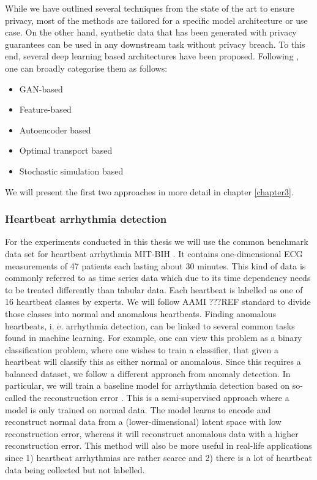 While we have outlined several techniques from the state of the art to ensure privacy, most of the methods are tailored for a specific model architecture or use case. On the other hand, synthetic data that has been generated with privacy guarantees can be used in any downstream task without privacy breach. To this end, several deep learning based architectures have been proposed. Following \parencite{hu2023sok}, one can broadly categorise them as follows:
\begin{itemize}
    \item GAN-based
    \item Feature-based
    \item Autoencoder based {\tiny \Parencite[see e. g.][for a generator based on a variational autoencoder that is trained with DP-SGD]{vae}}
    \item Optimal transport based {\tiny \Parencite[see e. g.][for generator based on the so-called Sinkhorn divergence]{cao2021dont}}
    \item Stochastic simulation based {\tiny \Parencite[see e. g.][for a differentially-private diffusion model]{dpgen}}
\end{itemize}

We will present the first two approaches in more detail in chapter \ref{chapter3}.

\subsubsection*{Heartbeat arrhythmia detection}
For the experiments conducted in this thesis we will use the common benchmark data set for heartbeat arrhythmia MIT-BIH \parencite{moody2001impact}. It contains one-dimensional ECG measurements of 47 patients each lasting about 30 minutes. This kind of data is commonly referred to as time series data which due to its time dependency needs to be treated differently than tabular data. Each heartbeat is labelled as one of 16 heartbeat classes by experts. We will follow AAMI ???REF standard to divide those classes into normal and anomalous heartbeats. Finding anomalous heartbeats, i. e. arrhythmia detection, can be linked to several common tasks found in machine learning. For example, one can view this problem as a binary classification problem, where one wishes to train a classifier, that given a heartbeat will classify this as either normal or anomalous. Since this requires a balanced dataset, we follow a different approach from anomaly detection. In particular, we will train a baseline model for arrhythmia detection based on so-called the reconstruction error \parencite[see][for an in-depth survey on anomaly detection with times series]{schmidl2022anomaly}. This is a semi-supervised approach where a model is only trained on normal data. The model learns to encode and reconstruct normal data from a (lower-dimensional) latent space with low reconstruction error, whereas it will reconstruct anomalous data with a higher reconstruction error. This method will also be more useful in real-life applications since 1) heartbeat arrhythmias are rather scarce and 2) there is a lot of heartbeat data being collected but not labelled.

